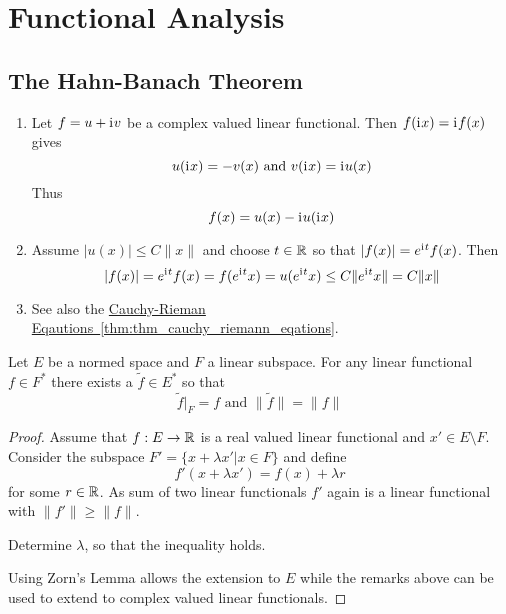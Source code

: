 \newpage
\section{Functional Analysis}

\subsection{The Hahn-Banach Theorem}
\bigskip

\begin{remarks}
    \hfill
    \begin{enumerate}
        \item Let \( f = u + \mathrm{i}\mkern1mu v\) be a complex valued linear functional.
              Then \( f(\mathrm{i}\mkern1mu x) = \mathrm{i}\mkern1mu f(x) \) gives
              \[
                  u(\mathrm{i}\mkern1mu x) = -v(x) \text{ and } v(\mathrm{i}\mkern1mu x) = \mathrm{i}\mkern1mu u(x)
              \]
              Thus
              \[
                  f(x) = u(x) - \mathrm{i}\mkern1mu u(\mathrm{i}\mkern1mu x)
              \]
        \item Assume \( |u(x)| \le C\|x\| \) and choose \( t \in \mathbb{R} \) so that \( |f(x)| = e^{\mathrm{i}\mkern1mu t}f(x) \).
              Then
              \[
                  |f(x)| = e^{\mathrm{i}\mkern1mu t}f(x) = f(e^{\mathrm{i}\mkern1mu t}x) = u(e^{\mathrm{i}\mkern1mu t}x) \le C\|e^{\mathrm{i}\mkern1mu t}x\| = C\|x\|
              \]
        \item
              See also the \hyperref[thm:thm_cauchy_riemann_eqations]{Cauchy-Rieman 
              Eqautions~\ref*{thm:thm_cauchy_riemann_eqations}}.
    \end{enumerate}
\end{remarks}
\bigskip


\begin{theorem}\label{thm:hahn_banach}
    Let \( E \) be a normed space and \( F \) a linear subspace. For any linear functional
    \( f \in F^* \) there exists a \( \tilde{f} \in E^* \) so that
    \[
        \tilde{f}|_F = f \text{ and } \|\tilde{f}\| = \|f\|
    \]
\end{theorem}

\begin{proof}
    Assume that \( f: E \to \mathbb{R} \) is a real valued linear functional and \( x' \in E \setminus F \).
    Consider the subspace \( F' = \{x + \lambda x' | x \in F \} \) and define
    \[
        f'(x + \lambda x') = f(x) + \lambda r
    \]
    for some \( r \in \mathbb{R} \).  As sum of two linear functionals \( f' \) again is a linear functional with
    \( \|f'\| \ge \|f\| \).

    Determine \( \lambda \), so that the inequality holds.

    Using Zorn's Lemma allows the extension to \( E \) while the remarks above can be used to extend
    to complex valued linear functionals.
\end{proof}
\bigskip


